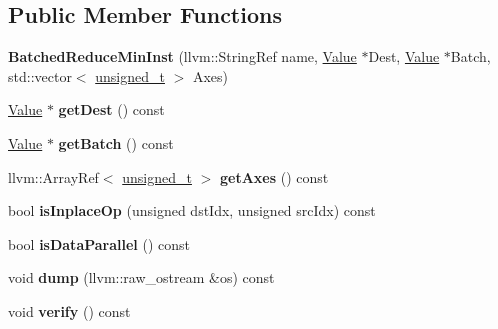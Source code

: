 \subsection*{Public Member Functions}
\begin{DoxyCompactItemize}
\item 
\mbox{\label{classglow_1_1_batched_reduce_min_inst_ad66a2cbbf5222689387cfd2030c21d55}} 
{\bfseries Batched\+Reduce\+Min\+Inst} (llvm\+::\+String\+Ref name, \hyperlink{classglow_1_1_value}{Value} $\ast$Dest, \hyperlink{classglow_1_1_value}{Value} $\ast$Batch, std\+::vector$<$ \hyperlink{namespaceglow_a0ca574644e1e42ef193a9947fb4d8911}{unsigned\+\_\+t} $>$ Axes)
\item 
\mbox{\label{classglow_1_1_batched_reduce_min_inst_a3e68b6f26678676e39524c390b2b2fbc}} 
\hyperlink{classglow_1_1_value}{Value} $\ast$ {\bfseries get\+Dest} () const
\item 
\mbox{\label{classglow_1_1_batched_reduce_min_inst_a3b0a7fcd8834aaef19b6627a816667cc}} 
\hyperlink{classglow_1_1_value}{Value} $\ast$ {\bfseries get\+Batch} () const
\item 
\mbox{\label{classglow_1_1_batched_reduce_min_inst_a6819b344098f91ddb045f8f243a5c968}} 
llvm\+::\+Array\+Ref$<$ \hyperlink{namespaceglow_a0ca574644e1e42ef193a9947fb4d8911}{unsigned\+\_\+t} $>$ {\bfseries get\+Axes} () const
\item 
\mbox{\label{classglow_1_1_batched_reduce_min_inst_a14171611ce88091ce0af819e92810128}} 
bool {\bfseries is\+Inplace\+Op} (unsigned dst\+Idx, unsigned src\+Idx) const
\item 
\mbox{\label{classglow_1_1_batched_reduce_min_inst_ae357a2ce8257df2e2a74fae0b11e1478}} 
bool {\bfseries is\+Data\+Parallel} () const
\item 
\mbox{\label{classglow_1_1_batched_reduce_min_inst_a6d7c6554c730cebbdf6e8f66af861a48}} 
void {\bfseries dump} (llvm\+::raw\+\_\+ostream \&os) const
\item 
\mbox{\label{classglow_1_1_batched_reduce_min_inst_a002db4b2119b5762e654dd7ced512d7a}} 
void {\bfseries verify} () const
\end{DoxyCompactItemize}
